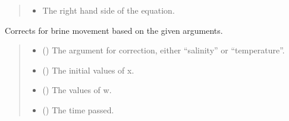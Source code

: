 \documentclass[a4paper,11pt,english,openany]{sphinxmanual}
\begin{document}
\begin{fulllineitems}
\begin{quote}
\begin{description}
\begin{itemize}
\item {} 
\sphinxAtStartPar
{} \textendash{} The right hand side of the equation.

\end{itemize}

\end{description}\end{quote}

\end{fulllineitems}


\begin{fulllineitems}
\label{\detokenize{api/spyice.rhs:spyice.rhs.correct_for_brine_movement}}
\pysigstartsignatures
{}
\pysigstopsignatures
\sphinxAtStartPar
Corrects for brine movement based on the given arguments.
\begin{quote}\begin{description}
\begin{itemize}
\item {} 
\sphinxAtStartPar
{} () \textendash{} The argument for correction, either “salinity” or “temperature”.

\item {} 
\sphinxAtStartPar
{} () \textendash{} The initial values of x.

\item {} 
\sphinxAtStartPar
{} () \textendash{} The values of w.

\item {} 
\sphinxAtStartPar
{} () \textendash{} The time passed.


\end{itemize}
\end{description}
\end{quote}
\end{fulllineitems}
\end{document}
